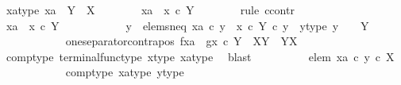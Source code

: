 \begin{isabellebody}
\ xa{\isacharunderscore}{\kern0pt}type{\isacharcolon}{\kern0pt}\ {\isachardoublequoteopen}xa\ {\isacharcolon}{\kern0pt}\ Y\ {\isasymrightarrow}\ X{\isachardoublequoteclose}\isanewline
\ \ \ \ \ \ \isamarkupfalse%
\ {\isachardoublequoteopen}xa\ {\isacharequal}{\kern0pt}\ x\ {\isasymcirc}\isactrlsub c\ {\isasymbeta}\isactrlbsub Y\isactrlesub {\isachardoublequoteclose}\isanewline
\ \ \ \ \ \ \isamarkupfalse%
\ {\isacharparenleft}{\kern0pt}rule\ ccontr{\isacharparenright}{\kern0pt}\isanewline
\ \ \ \ \ \ \ \ \isamarkupfalse%
\ {\isachardoublequoteopen}xa\ {\isasymnoteq}\ x\ {\isasymcirc}\isactrlsub c\ {\isasymbeta}\isactrlbsub Y\isactrlesub {\isachardoublequoteclose}\isanewline
\ \ \ \ \ \ \ \ \isamarkupfalse%
\ \isamarkupfalse%
\ y\ \ elems{\isacharunderscore}{\kern0pt}neq{\isacharcolon}{\kern0pt}\ {\isachardoublequoteopen}xa\ {\isasymcirc}\isactrlsub c\ y\ {\isasymnoteq}\ {\isacharparenleft}{\kern0pt}x\ {\isasymcirc}\isactrlsub c\ {\isasymbeta}\isactrlbsub Y\isactrlesub {\isacharparenright}{\kern0pt}\ {\isasymcirc}\isactrlsub c\ y{\isachardoublequoteclose}\ \ y{\isacharunderscore}{\kern0pt}type{\isacharcolon}{\kern0pt}\ {\isachardoublequoteopen}y\ {\isacharcolon}{\kern0pt}\ {\isasymone}\ {\isasymrightarrow}\ Y{\isachardoublequoteclose}\isanewline
\ \ \ \ \ \ \ \ \ \ \isamarkupfalse%
\ one{\isacharunderscore}{\kern0pt}separator{\isacharunderscore}{\kern0pt}contrapos{\isacharbrackleft}{\kern0pt}\ f{\isacharequal}{\kern0pt}xa{\isacharcomma}{\kern0pt}\ \ g{\isacharequal}{\kern0pt}{\isachardoublequoteopen}x\ {\isasymcirc}\isactrlsub c\ {\isasymbeta}\isactrlbsub Y\isactrlesub {\isachardoublequoteclose}{\isacharcomma}{\kern0pt}\ \ X{\isacharequal}{\kern0pt}Y{\isacharcomma}{\kern0pt}\ \ Y{\isacharequal}{\kern0pt}X{\isacharbrackright}{\kern0pt}\isanewline
\ \ \ \ \ \ \ \ \ \ \isamarkupfalse%
\ comp{\isacharunderscore}{\kern0pt}type\ terminal{\isacharunderscore}{\kern0pt}func{\isacharunderscore}{\kern0pt}type\ x{\isacharunderscore}{\kern0pt}type\ xa{\isacharunderscore}{\kern0pt}type\ \isamarkupfalse%
\ blast\isanewline
\ \ \ \ \ \ \ \ \isamarkupfalse%
\ elem{}{\isacharcolon}{\kern0pt}\ {\isachardoublequoteopen}xa\ {\isasymcirc}\isactrlsub c\ y\ {\isasymin}\isactrlsub c\ X{\isachardoublequoteclose}\isanewline
\ \ \ \ \ \ \ \ \ \ \isamarkupfalse%
\ comp{\isacharunderscore}{\kern0pt}type\ xa{\isacharunderscore}{\kern0pt}type\ y{\isacharunderscore}{\kern0pt}type\ \isamarkupfalse%

\end{isabellebody}
